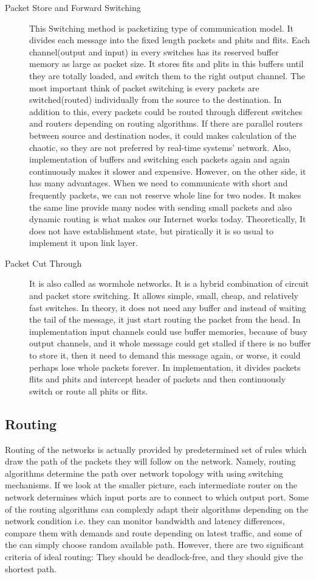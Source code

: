 \begin{description}
            \item[Packet Store and Forward Switching] This Switching method is packetizing type of communication model. It divides each message into the fixed length packets and phits and flits. Each channel(output and input) in every switches has its reserved buffer memory as large as packet size. It stores fits and plits in this buffers until they are totally loaded, and switch them to the right output channel. The most important think of packet switching is every packets are switched(routed) individually from the source to the destination. In addition to this, every packets could be routed through different switches and routers depending on routing algorithms. If there are parallel routers between source and destination nodes, it could makes calculation of the chaotic, so they are not preferred by real-time systems' network. Also, implementation of buffers and switching each packets again and again continuously makes it slower and expensive. However, on the other side, it has many advantages. When we need to communicate with short and frequently packets, we can not reserve whole line for two nodes. It makes the same line provide many nodes with sending small packets and also dynamic routing is what makes our Internet works today. Theoretically, It does not have establishment state, but piratically it is so usual to implement it upon link layer.
            \item[Packet Cut Through] It is also called as wormhole networks. It is a hybrid combination of circuit and packet store switching. It allows simple, small, cheap, and relatively fast switches. In theory, it does not need any buffer and instead of waiting the tail of the message, it just start routing the packet from the head. In implementation input channels could use buffer memories, because of busy output channels, and it whole message could get stalled if there is no buffer to store it, then it need to demand this message again, or worse, it could perhaps lose whole packets forever. In implementation, it divides packets flits and phits and intercept header of packets and then continuously switch or route all phits or flits.
        \end{description}
        \subsection{Routing}
        Routing of the networks is actually provided by predetermined set of rules which draw the path of the packets they will follow on the network. Namely, routing algorithms determine the path over network topology with using switching mechanisms. If we look at the smaller picture, each intermediate router on the network determines which input ports are to connect to which output port. Some of the routing algorithms can complexly adapt their algorithms depending on the network condition i.e. they can monitor bandwidth and latency differences, compare them with demands and route depending on latest traffic, and some of the can simply choose random available path. However, there are two significant criteria of ideal routing: They should be deadlock-free, and they should give the shortest path.

